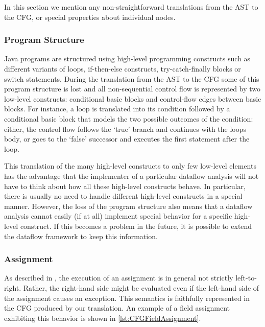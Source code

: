 In this section we mention any non-straightforward translations from the AST to
the CFG, or special properties about individual nodes.


\subsubsection{Program Structure}
\label{sec:prog-structure}

Java programs are structured using high-level programming constructs such as
different variants of loops, if-then-else constructs, try-catch-finally blocks
or switch statements.  During the translation from the AST to the CFG some
of this program structure is lost and all non-sequential control flow is
represented by two low-level constructs: conditional basic blocks and
control-flow edges between basic blocks. For instance, a  loop is translated
into its condition followed by a conditional basic block that models the two
possible outcomes of the condition: either, the control flow follows the
`true' branch and continues with the loops body, or goes to the `false'
successor and executes the first statement after the loop.

This translation of the many high-level constructs to only few low-level
elements has the advantage that the implementer of a particular dataflow
analysis will not have to think about how all these high-level constructs
behave. In particular, there is usually no need to handle different high-level
constructs in a special manner. However, the loss of the program structure
also means that a dataflow analysis cannot easily (if at all) implement special behavior
for a specific high-level construct. If this becomes a problem in the future,
it is possible to extend the dataflow framework to keep this information.



\subsubsection{Assignment}

As described in , the execution of an assignment is in general
not strictly left-to-right. Rather, the right-hand side might be evaluated even
if the left-hand side of the assignment causes an exception. This semantics is faithfully
represented in the CFG produced by our translation.
An example of a field assignment exhibiting this behavior is shown in \autoref{lst:CFGFieldAssignment}.



